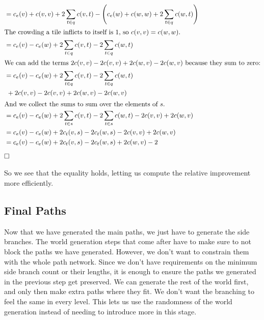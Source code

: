 \begin{align*}
     & = c_e(v) + c(v,v) + 2 \sum_{t \in q} c(v,t) - \left(c_e(w) + c(w,w) + 2 \sum_{t \in q} c(w,t) \right)                                                  \\
    \intertext{The crowding a tile inflicts to itself is 1, so $c(v,v) = c(w,w)$.}
     & = c_e(v) - c_e(w)  + 2 \sum_{t \in q} c(v,t) - 2 \sum_{t \in q} c(w,t)                                                                                 \\
    \intertext{We can add the terms $2c(v,v) - 2c(v,v) + 2c(w,v) - 2c(w,v)$ because they sum to zero:}
     & = c_e(v) - c_e(w)  + 2 \sum_{t \in q} c(v,t) - 2 \sum_{t \in q} c(w,t)                                                                                 \\
     & \ + 2c(v,v) - 2c(v,v) + 2c(w,v) - 2c(w,v)                                                                                                              \\
    \intertext{And we collect the sums to sum over the elements of $s$.}
     & = c_e(v) - c_e(w)  + 2 \sum_{t \in s} c(v,t) - 2 \sum_{t \in s} c(w,t) - 2c(v,v) + 2c(w,v)                                                             \\
     & = c_e(v) - c_e(w)  + 2 c_t(v,s) - 2 c_t(w,s) - 2c(v,v) + 2c(w,v)                                                                                       \\
     & = c_e(v) - c_e(w)  + 2 c_t(v,s) - 2 c_t(w,s) + 2c(w,v) - 2
\end{align*}
$\hfill\square$

So we see that the equality holds, letting us compute the relative improvement more efficiently.

\subsection{Final Paths}

Now that we have generated the main paths, we just have to generate the side branches.
The world generation steps that come after have to make sure to not block the paths we have generated.
However, we don't want to constrain them with the whole path network.
Since we don't have requirements on the minimum side branch count or their lengths, it is enough to ensure the paths we generated in the previous step get preserved.
We can generate the rest of the world first, and only then make extra paths where they fit.
We don't want the branching to feel the same in every level.
This lets us use the randomness of the world generation instead of needing to introduce more in this stage.

